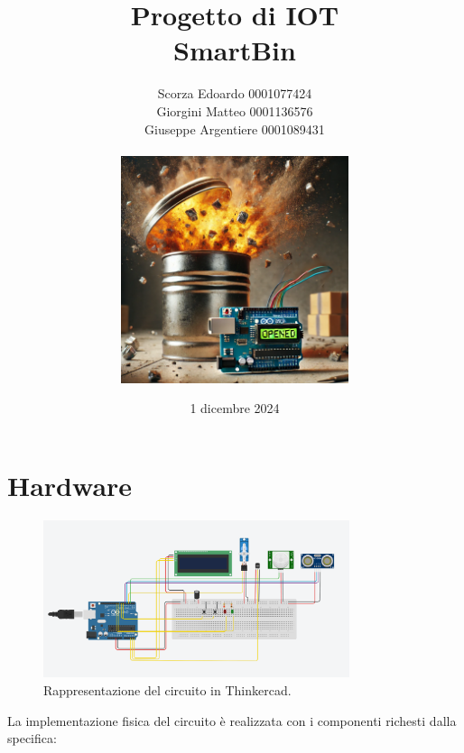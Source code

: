 \documentclass[a4paper,12pt]{report}
\title{Progetto di IOT
    \\ SmartBin}
\author{Scorza Edoardo 0001077424 \\ Giorgini Matteo 0001136576 \\ Giuseppe Argentiere 0001089431 \\\\
\includegraphics[width=0.5\textwidth]{images/cover.png} }
\date{1 dicembre 2024}
\begin{document}
\maketitle
\tableofcontents
\chapter{Hardware}
\begin{figure}[H] %
    \centering
    \includegraphics[width=0.8\textwidth]{images/circuito.png} %
    \caption{Rappresentazione del circuito in Thinkercad.}
    \label{fig:sample-image} %
\end{figure}
\vspace{1cm}
La implementazione fisica del circuito è realizzata con i componenti 
richesti dalla specifica:
\end{document}
